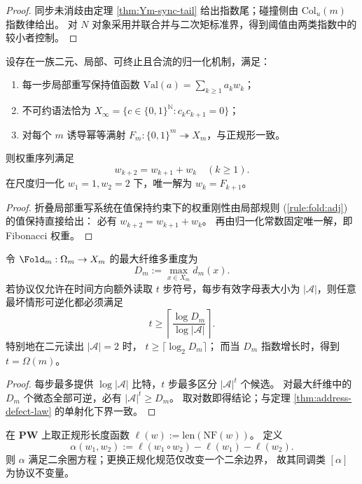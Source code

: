 \begin{proof}
同步未消歧由定理 \ref{thm:Ym-sync-tail} 给出指数尾；碰撞侧由 \(\mathrm{Col}_u(m)\) 指数律给出。
对 \(N\) 对象采用并联合并与二次矩标准界，得到阈值由两类指数中的较小者控制。
\end{proof}

\begin{proposition}\label{prop:xi-local-binary-normalization-fibonacci-rigidity}
设存在一族二元、局部、可终止且合流的归一化机制，满足：
\begin{enumerate}
  \item 每一步局部重写保持值函数 \(\mathrm{Val}(a)=\sum_{k\ge 1}a_k w_k\)；
  \item 不可约语法恰为 \(X_\infty=\{c\in\{0,1\}^{\mathbb N}:c_kc_{k+1}=0\}\)；
  \item 对每个 \(m\) 诱导幂等满射 \(F_m:\{0,1\}^m\twoheadrightarrow X_m\)，与正规形一致。
\end{enumerate}
则权重序列满足
\[
w_{k+2}=w_{k+1}+w_k\quad(k\ge 1).
\]
在尺度归一化 \(w_1=1,w_2=2\) 下，唯一解为 \(w_k=F_{k+1}\)。
\end{proposition}

\begin{proof}
折叠局部重写系统在值保持约束下的权重刚性由局部规则
\textup{(\ref{rule:fold:adj})} 的值保持直接给出：
必有 \(w_{k+2}=w_{k+1}+w_k\)。
再由归一化常数固定唯一解，即 Fibonacci 权重。
\end{proof}

\begin{theorem}[残差外置的时间下界]\label{thm:xi-time-lower-bound-from-max-fiber}
令 \(\Fold_m:\Omega_m\to X_m\) 的最大纤维多重度为
\[
D_m:=\max_{x\in X_m}d_m(x).
\]
若协议仅允许在时间方向额外读取 \(t\) 步符号，每步有效字母表大小为 \(|\mathcal A|\)，则任意最坏情形可逆化都必须满足
\[
t\ge
\left\lceil
\frac{\log D_m}{\log |\mathcal A|}
\right\rceil.
\]
特别地在二元读出 \(|\mathcal A|=2\) 时，
\(
t\ge \lceil \log_2 D_m\rceil
\)；
而当 \(D_m\) 指数增长时，得到 \(t=\Omega(m)\)。
\end{theorem}

\begin{proof}
每步最多提供 \(\log|\mathcal A|\) 比特，\(t\) 步最多区分 \(|\mathcal A|^t\) 个候选。
对最大纤维中的 \(D_m\) 个微态全部可逆，必有 \(|\mathcal A|^t\ge D_m\)。
取对数即得结论；与定理 \ref{thm:address-defect-law} 的单射化下界一致。
\end{proof}

\begin{proposition}[时间长度异常为二余圈]\label{prop:xi-time-length-cocycle}
在 \(\mathbf{PW}\) 上取正规形长度函数
\(
\ell(w):=\mathrm{len}(\mathrm{NF}(w))
\)。
定义
\[
\alpha(w_1,w_2):=\ell(w_1\circ w_2)-\ell(w_1)-\ell(w_2).
\]
则 \(\alpha\) 满足二余圈方程；更换正规化规范仅改变一个二余边界，
故其同调类 \([\alpha]\) 为协议不变量。
\end{proposition}

